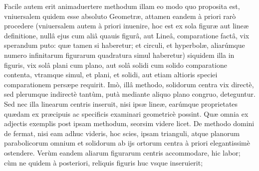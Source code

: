 \documentclass[11pt,a4paper]{article}
\begin{document}
Facile autem erit animaduertere methodum illam eo modo quo proposita est, vniuersalem quidem esse absoluto Geometræ, attamen eandem à priori rarò procedere (vniuersalem autem à priori inuenire, hoc est ex sola figuræ aut lineæ definitione, nullâ ejus cum aliâ quauis figurâ, aut Lineâ, comparatione factâ, vix sperandum puto: quæ tamen si haberetur; et circuli, et hyperbolæ, aliarúmque numero infinitarum figurarum quadratura simul haberetur) siquidem illa in figuris, vix solâ plani cum plano, aut solâ solidi cum solido comparatione contenta, vtramque simul, et plani, et solidi, aut etiam altioris speciei comparationem persæpe requirit. Imò, illâ methodo, solidorum centra vix directè, sed plerumque indirectè tantùm, putà mediante aliquo plano congruo, deteguntur. Sed nec illa linearum centris inseruit, nisi ipsæ lineæ, earúmque proprietates quædam ex præcipuis ac specificis examinari geometricè possint. Quæ omnia ex adjectis exemplis post ipsam methodum, seorsim videre licet. De methodo domini de fermat, nisi eam adhuc videris, hoc scies, ipsam trianguli, atque planorum parabolicorum omnium et solidorum ab ijs ortorum centra à priori elegantissimè ostendere. Verùm eandem aliarum figurarum centris accommodare, hic labor; cùm ne quidem à posteriori, reliquis figuris huc vsque inseruierit;

\end{document}
